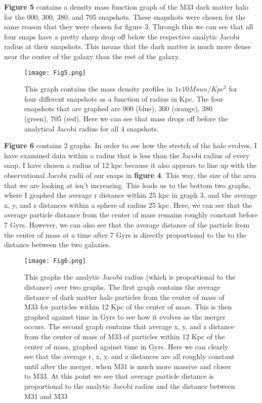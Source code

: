\documentclass[fleqn,usenatbib]{mnras}
\begin{document}
\textbf{Figure 5} contains a density mass function graph of the M33 dark matter halo for the 000, 300, 380, and 705 snapshots. These snapshots were chosen for the same reason that they were chosen for figure 3. Through this we can see that all four snaps have a pretty sharp drop off below the respective analytic Jacobi radius at their snapshots. This means that the dark matter is much more dense near the center of the galaxy than the rest of the galaxy.

\begin{figure}
                \centering
                \texttt{[image: Fig5.png]}
                \label{fig:enter-label}
            \caption{This graph contains the mass density profiles in $1e10Msun/Kpc^3$ for four different snapshots as a function of radius in Kpc. The four snapshots that are graphed are 000 (blue), 300 (orange), 380 (green), 705 (red). Here we can see that mass drops off before the analytical Jacobi radius for all 4 snapshots.}
            \end{figure}

\textbf{Figure 6} contains 2 graphs. In order to see how the stretch of the halo evolves, I have examined data within a radius that is less than the Jacobi radius of every snap. I have chosen a radius of 12 kpc because it also appears to line up with the observational Jacobi radii of our snaps in \textbf{figure 4}. This way, the size of the area that we are looking at isn't increasing. This leads us to the bottom two graphs, where I graphed the average r distance within 25 kpc in graph 3, and the average x, y, and z distances within a sphere of radius 25 kpc. Here, we can see that the average particle distance from the center of mass remains roughly constant before 7 Gyrs. However, we can also see that the average distance of the particle from the center of mass at a time after 7 Gyrs is directly proportional to the to the distance between the two galaxies.


\begin{figure}
                \centering
                \texttt{[image: Fig6.png]}
                \label{fig:enter-label}
            \caption{This graphs the analytic Jacobi radius (which is proportional to the distance) over two graphs. The first graph contains the average distance of dark matter halo particles from the center of mass of M33 for particles within 12 Kpc of the center of mass. This is then graphed against time in Gyrs to see how it evolves as the merger occurs. The second graph contains that average x, y, and z distance from the center of mass of M33 of particles within 12 Kpc of the center of mass, graphed against time in Gyrs. Here we can clearly see that the average r, x, y, and z distances are all roughly constant until after the merger, when M31 is much more massive and closer to M33. At this point we see that average particle distance is proportional to the analytic Jacobi radius and the distance between M31 and M33}
            \end{figure}
\end{document}
